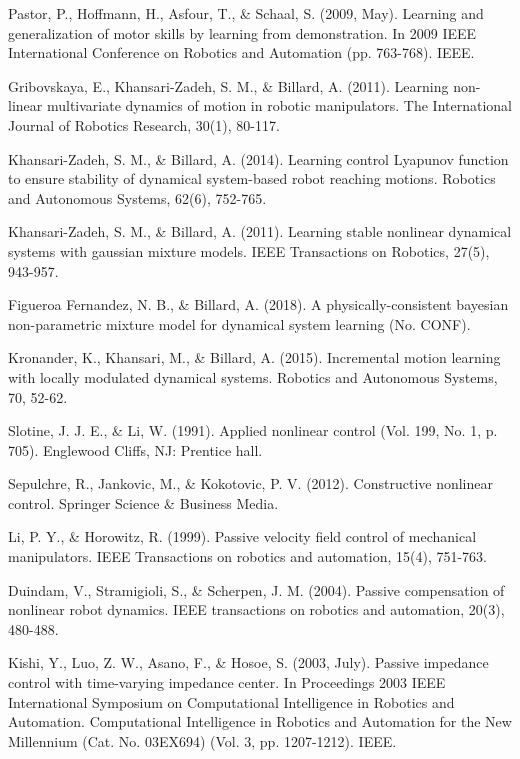 \begin{thebibliography}{00}

 Pastor, P., Hoffmann, H., Asfour, T., \& Schaal, S. (2009, May). Learning and generalization of motor skills by learning from demonstration. In 2009 IEEE International Conference on Robotics and Automation (pp. 763-768). IEEE.

 Gribovskaya, E., Khansari-Zadeh, S. M., \& Billard, A. (2011). Learning non-linear multivariate dynamics of motion in robotic manipulators. The International Journal of Robotics Research, 30(1), 80-117.

 Khansari-Zadeh, S. M., \& Billard, A. (2014). Learning control Lyapunov function to ensure stability of dynamical system-based robot reaching motions. Robotics and Autonomous Systems, 62(6), 752-765.

 Khansari-Zadeh, S. M., \& Billard, A. (2011). Learning stable nonlinear dynamical systems with gaussian mixture models. IEEE Transactions on Robotics, 27(5), 943-957.

 Figueroa Fernandez, N. B., \& Billard, A. (2018). A physically-consistent bayesian non-parametric mixture model for dynamical system learning (No. CONF).

 Kronander, K., Khansari, M., \& Billard, A. (2015). Incremental motion learning with locally modulated dynamical systems. Robotics and Autonomous Systems, 70, 52-62.

 Slotine, J. J. E., \& Li, W. (1991). Applied nonlinear control (Vol. 199, No. 1, p. 705). Englewood Cliffs, NJ: Prentice hall.

 Sepulchre, R., Jankovic, M., \& Kokotovic, P. V. (2012). Constructive nonlinear control. Springer Science \& Business Media.

 Li, P. Y., \& Horowitz, R. (1999). Passive velocity field control of mechanical manipulators. IEEE Transactions on robotics and automation, 15(4), 751-763.

 Duindam, V., Stramigioli, S., \& Scherpen, J. M. (2004). Passive compensation of nonlinear robot dynamics. IEEE transactions on robotics and automation, 20(3), 480-488.

 Kishi, Y., Luo, Z. W., Asano, F., \& Hosoe, S. (2003, July). Passive impedance control with time-varying impedance center. In Proceedings 2003 IEEE International Symposium on Computational Intelligence in Robotics and Automation. Computational Intelligence in Robotics and Automation for the New Millennium (Cat. No. 03EX694) (Vol. 3, pp. 1207-1212). IEEE.


\end{thebibliography}
